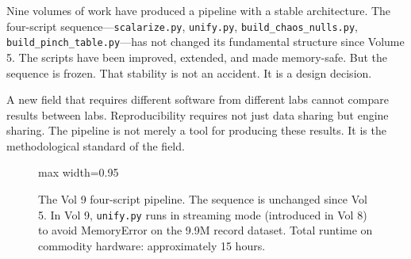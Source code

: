 \documentclass[11pt, letterpaper, openany]{book}
\begin{document}
Nine volumes of work have produced a pipeline with a stable architecture. The
four-script sequence---\texttt{scalarize.py}, \texttt{unify.py},
\texttt{build\_chaos\_nulls.py}, \texttt{build\_pinch\_table.py}---has not
changed its fundamental structure since Volume 5. The scripts have been improved,
extended, and made memory-safe. But the sequence is frozen. That stability is not
an accident. It is a design decision.

A new field that requires different software from different labs cannot compare
results between labs. Reproducibility requires not just data sharing but engine
sharing. The pipeline is not merely a tool for producing these results. It is the
methodological standard of the field.

\begin{figure}[H]
\centering
\begin{adjustbox}{max width=0.95\textwidth} %
\end{adjustbox}
\caption{The Vol 9 four-script pipeline. The sequence is unchanged since Vol 5.
In Vol 9, \texttt{unify.py} runs in streaming mode (introduced in Vol 8) to avoid
MemoryError on the 9.9M record dataset. Total runtime on commodity hardware:
approximately 15 hours.}
\label{fig:pipeline_v9}
\end{figure}
\end{document}

